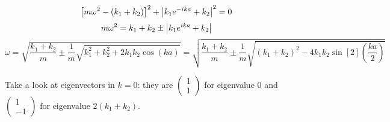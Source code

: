 $$\qty[m\omega^2 - (k_1+k_2)]^2 + \abs{k_1 e^{ - ika} +k_2}^2 = 0$$
$$m\omega^2 = k_1+k_2 \pm \abs{k_1e^{ika} + k_2}$$
$$\omega = \sqrt{\frac{k_1+k_2}{m} \pm \frac{1}{m}\sqrt{k_1^2 + k_2^2+2k_1k_2\cos(ka)}} = \sqrt{\frac{k_1+k_2}{m} \pm \frac{1}{m}\sqrt{(k_1 + k_2)^2-4k_1k_2\sin[2](\frac{ka}{2})}}$$

Take a look at eigenvectors in $k=0$:
they are $\begin{pmatrix}
1\\1
\end{pmatrix}$ for eigenvalue $0$ and $\begin{pmatrix}
1\\-1
\end{pmatrix}$ for eigenvalue $2(k_1+k_2)$. 
